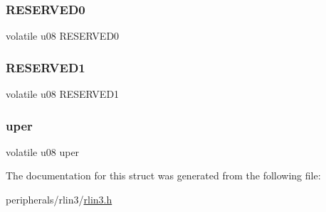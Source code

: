 \subsubsection{\texorpdfstring{R\+E\+S\+E\+R\+V\+E\+D0}{RESERVED0}}
{\footnotesize\ttfamily volatile u08 R\+E\+S\+E\+R\+V\+E\+D0}

\mbox{\label{structrlin3__lest__uart_a715c3fdf1f14a6aa267daed3d2d6fba1}} 
\subsubsection{\texorpdfstring{R\+E\+S\+E\+R\+V\+E\+D1}{RESERVED1}}
{\footnotesize\ttfamily volatile u08 R\+E\+S\+E\+R\+V\+E\+D1}

\mbox{\label{structrlin3__lest__uart_a62dc79b71c0ff7a5228e0e7632b0ab80}} 
\subsubsection{\texorpdfstring{uper}{uper}}
{\footnotesize\ttfamily volatile u08 uper}



The documentation for this struct was generated from the following file\+:\begin{DoxyCompactItemize}
\item 
peripherals/rlin3/\mbox{\hyperlink{rlin3_8h}{rlin3.\+h}}\end{DoxyCompactItemize}
